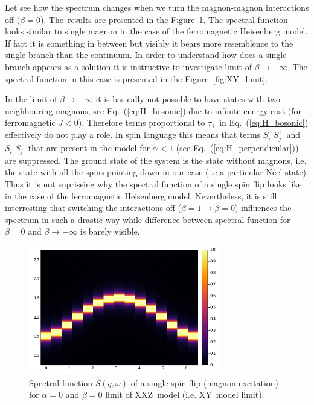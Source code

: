 \documentclass[12pt, a4paper]{article}
\begin{document}
Let see how the spectrum changes when we turn the magnon-magnon interactions off ($\beta = 0$). The~results are presented in the Figure~\ref{fig:XY_noint}. The spectral function looks similar to single magnon in the case of the ferromagnetic Heisenberg model. If fact it is something in between but visibly it bears more resemblence to the single branch than the continuum. In order to understand how does a single branch appears as a solution it is instructive to investigate limit of $\beta \to -\infty$. The spectral function in this case is presented in the Figure~\ref{fig:XY_limit}. 

In the limit of $\beta \to -\infty$ it is basically not possible to have states with two neighbouring magnons, see Eq.~(\ref{eq:H_bosonic}) due to infinite energy cost (for ferromagnetic $J<0$). Therefore terms proportional to $\tau_{\perp}$ in Eq.~(\ref{eq:H_bosonic}) effectively do not play a role. In spin language this means that terms $S_i^+ S_j^+$ and $S_i^- S_j^-$ that are present in the model for $\alpha < 1$ (see Eq.~(\ref{eq:H_perpendicular})) are suppressed. The ground state of the system is the state without magnons, i.e. the state with all the spins pointing down in our case (i.e a particular N\'eel state). Thus it is not suprissing why the spectral function of a single spin flip looks like in the case of the ferromagnetic Heisenberg model. Nevertheless, it is still interresting that switching the interactions off ($\beta = 1 \rightarrow \beta = 0$) influences the spectrum in such a drastic way while difference between spectral function for $\beta = 0$ and $\beta \to -\infty$ is barely visible.
\begin{figure}[ht]
	\centering
	\includegraphics[width=0.75\textwidth]{../figures/fig002.png}
	\caption{Spectral function $S(q,\omega)$ of a single spin flip (magnon excitation) for $\alpha = 0$ and $\beta = 0$ limit of XXZ~model (i.e. XY~model limit).}\label{fig:XY_noint}
\end{figure}
\end{document}
